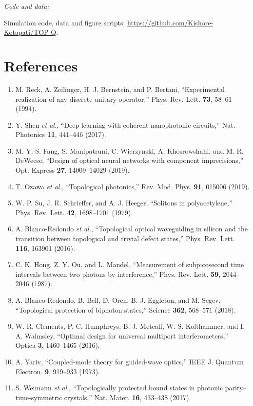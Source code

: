 \documentclass[journal,11pt]{IEEEtran}
\newcommand{\mhead}[1]{\par\vspace{3pt}\noindent\emph{#1:}\par\nopagebreak\vspace{1pt}\noindent\ignorespaces}
\begin{document}
\mhead{Code and data}Simulation code, data and figure scripts: \url{https://github.com/Kishore-Kotapati/TOP-Q}.

\section*{References}
{\footnotesize
\begin{enumerate}
\renewcommand{\labelenumi}{\arabic{enumi}.}
\setlength{\itemsep}{0pt}\setlength{\parskip}{0pt}\setlength{\leftmargin}{1.6em}
\item M. Reck, A. Zeilinger, H. J. Bernstein, and P. Bertani, ``Experimental realization of any discrete unitary operator,'' Phys. Rev. Lett. \textbf{73}, 58--61 (1994).
\item Y. Shen \emph{et al.}, ``Deep learning with coherent nanophotonic circuits,'' Nat. Photonics \textbf{11}, 441--446 (2017).
\item M. Y.-S. Fang, S. Manipatruni, C. Wierzynski, A. Khosrowshahi, and M. R. DeWeese, ``Design of optical neural networks with component imprecisions,'' Opt. Express \textbf{27}, 14009--14029 (2019).
\item T. Ozawa \emph{et al.}, ``Topological photonics,'' Rev. Mod. Phys. \textbf{91}, 015006 (2019).
\item W. P. Su, J. R. Schrieffer, and A. J. Heeger, ``Solitons in polyacetylene,'' Phys. Rev. Lett. \textbf{42}, 1698--1701 (1979).
\item A. Blanco-Redondo \emph{et al.}, ``Topological optical waveguiding in silicon and the transition between topological and trivial defect states,'' Phys. Rev. Lett. \textbf{116}, 163901 (2016).
\item C. K. Hong, Z. Y. Ou, and L. Mandel, ``Measurement of subpicosecond time intervals between two photons by interference,'' Phys. Rev. Lett. \textbf{59}, 2044--2046 (1987).
\item A. Blanco-Redondo, B. Bell, D. Oren, B. J. Eggleton, and M. Segev, ``Topological protection of biphoton states,'' Science \textbf{362}, 568--571 (2018).
\item W. R. Clements, P. C. Humphreys, B. J. Metcalf, W. S. Kolthammer, and I. A. Walmsley, ``Optimal design for universal multiport interferometers,'' Optica \textbf{3}, 1460--1465 (2016).
\item A. Yariv, ``Coupled-mode theory for guided-wave optics,'' IEEE J. Quantum Electron. \textbf{9}, 919--933 (1973).
\item S. Weimann \emph{et al.}, ``Topologically protected bound states in photonic parity--time-symmetric crystals,'' Nat. Mater. \textbf{16}, 433--438 (2017).

\end{enumerate}}
\end{document}
